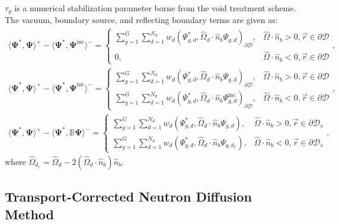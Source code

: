 \documentclass[letterpaper]{mc2025}
\begin{document}
%
$\tau_g$ is a numerical stabilization parameter borne from the void treatment scheme.
The vacuum, boundary source, and reflecting boundary terms are given as:
%
\begin{gather}
  \langle\bm{\Psi}^*,\bm{\Psi}\rangle^+ - \langle\bm{\Psi}^*,\bm{\Psi}^\text{inc}\rangle^- =
  \begin{cases}
    \sum^G_{g=1}\sum^{N_d}_{d=1}w_d\left(\Psi^*_{g,d},
    \hat{\Omega}_d\cdot\hat{n}_b\Psi_{g,d}\right)_{\partial\mathcal{D}},
    & \hat{\Omega}\cdot\hat{n}_b>0,\vec{r}\in\partial\mathcal{D} \\
    0,
    & \hat{\Omega}\cdot\hat{n}_b<0,\vec{r}\in\partial\mathcal{D}
  \end{cases}, \\
  \langle\bm{\Psi}^*,\bm{\Psi}\rangle^+ - \langle\bm{\Psi}^*,\bm{\Psi}^\text{inc}\rangle^- =
  \begin{cases}
    \sum^G_{g=1}\sum^{N_d}_{d=1}w_d\left(\Psi^*_{g,d},
    \hat{\Omega}_d\cdot\hat{n}_b\Psi_{g,d}\right)_{\partial\mathcal{D}},
    & \hat{\Omega}\cdot\hat{n}_b>0,\vec{r}\in\partial\mathcal{D} \\
    \sum^G_{g=1}\sum^{N_d}_{d=1}w_d\left(\Psi^*_{g,d},
    \hat{\Omega}_d\cdot\hat{n}_b\Psi^\text{inc}_{g,d}\right)_{\partial\mathcal{D}},
    & \hat{\Omega}\cdot\hat{n}_b<0,\vec{r}\in\partial\mathcal{D}
  \end{cases}, \label{eq:boundary-source} \\
  \langle\bm{\Psi}^*,\bm{\Psi}\rangle^+ - \langle\bm{\Psi}^*,\mathbb{B}\bm{\Psi}\rangle^- =
  \begin{cases}
    \sum^G_{g=1}\sum^{N_d}_{d=1}w_d\left(\Psi^*_{g,d},
    \hat{\Omega}_d\cdot\hat{n}_b\Psi_{g,d}\right),
    & \hat{\Omega}\cdot\hat{n}_b>0,\vec{r}\in\partial\mathcal{D}_s \\
    \sum^G_{g=1}\sum^{N_d}_{d=1}w_d\left(\Psi^*_{g,d},
    \hat{\Omega}_d\cdot\hat{n}_b\Psi_{g,d_r}\right),
    & \hat{\Omega}\cdot\hat{n}_b<0,\vec{r}\in\partial\mathcal{D}_s
  \end{cases}, \label{eq:reflecting-bc}
\end{gather}
%
where $\hat{\Omega}_{d_r} = \hat{\Omega}_d - 2(\hat{\Omega}_d\cdot\hat{n}_b)\hat{n}_b$.

\subsection{Transport-Corrected Neutron Diffusion Method} \label{sec:transport-correction}

\end{document}
